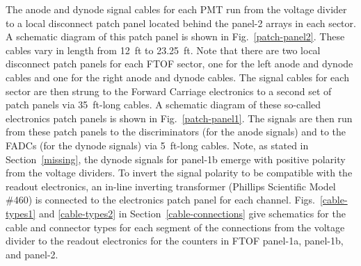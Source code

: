 \documentclass[12pt]{article}
\begin{document}
The anode and dynode signal cables for each PMT run from the voltage divider to a local 
disconnect patch panel located behind the panel-2 arrays in each sector. A schematic 
diagram of this patch panel is shown in Fig.~\ref{patch-panel2}. These cables vary in 
length from 12~ft to 23.25~ft. Note that there are two local disconnect patch panels for 
each FTOF sector, one for the left anode and dynode cables and one for the right anode 
and dynode cables. The signal cables for each sector are then strung to the Forward 
Carriage electronics to a second set of patch panels via 35~ft-long cables. A schematic 
diagram of these so-called electronics patch panels is shown in Fig.~\ref{patch-panel1}. 
The signals are then run from these patch panels to the discriminators (for the anode 
signals) and to the FADCs (for the dynode signals) via 5~ft-long cables. Note, as stated 
in Section~\ref{missing}, the dynode signals for panel-1b emerge with positive 
polarity from the voltage dividers. To invert the signal polarity to be compatible with 
the readout electronics, an in-line inverting transformer (Phillips Scientific Model 
\#460) is connected to the electronics patch panel for each channel. 
Figs.~\ref{cable-types1} and \ref{cable-types2} in Section~\ref{cable-connections} give 
schematics for the cable and connector types for each segment of the connections from 
the voltage divider to the readout electronics for the counters in FTOF panel-1a, 
panel-1b, and panel-2.
\end{document}
